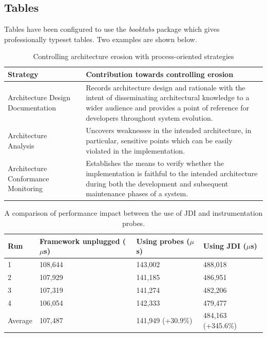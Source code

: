\subsection{Tables}
Tables have been configured to use the \emph{booktabs} package which gives professionally typeset tables. Two examples are shown below.

\begin{table}[h]\small
	\centering
	\begin{tabulary}{\textwidth}{lp{3pt}J}
		\toprule
		Strategy && Contribution towards controlling erosion \\
		\midrule
		Architecture Design Documentation & \RIGHTarrow & Records architecture design and rationale with the intent of disseminating architectural knowledge to a wider audience and provides a point of reference for developers throughout system evolution. \\ [7pt]
		Architecture Analysis & \RIGHTarrow & Uncovers weaknesses in the intended architecture, in particular, sensitive points which can be easily violated in the implementation.  \\ [7pt]
		Architecture Conformance Monitoring & \RIGHTarrow & Establishes the means to verify whether the implementation is faithful to the intended architecture during both the development and subsequent maintenance phases of a system. \\ [7pt]
		\bottomrule
	\end{tabulary}
	\caption{Controlling architecture erosion with process-oriented strategies}
	\label{tab:process-oriented}
\end{table}

\begin{table}[h]
	\centering
	\begin{tabular}{llll} 
		\toprule
		Run 		& Framework unplugged ($\mu$s)	& Using probes	($\mu$s) & Using JDI ($\mu$s)	\\
		\midrule
		1		& 108,644			& 143,002				& 488,018		\\
		2		& 107,929			& 141,185				& 486,951		\\
		3		& 107,319			& 141,274				& 482,206		\\
		4		& 106,054			& 142,333				& 479,477		\\
		\midrule
		Average	& 107,487			& 141,949 (+30.9\%)		& 484,163 (+345.6\%)	\\
		\bottomrule
	\end{tabular}
	\caption{A comparison of performance impact between the use of JDI and instrumentation probes.}
	\label{tab:performance}
\end{table}


